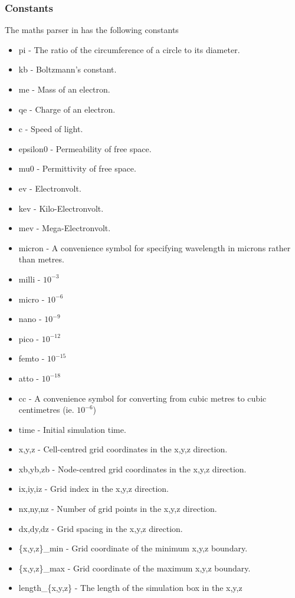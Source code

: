 \subsubsection{Constants}
\label{sec:constants}
The maths parser in {\EPOCH}  has the following constants
\begin{itemize}
\item pi - The ratio of the circumference of a circle to its diameter.
\item kb - Boltzmann's constant.
\item me - Mass of an electron.
\item qe - Charge of an electron.
\item c - Speed of light.
\item epsilon0 - Permeability of free space.
\item mu0 - Permittivity of free space.
\item ev - Electronvolt.
\item kev - Kilo-Electronvolt.
\item mev - Mega-Electronvolt.
\item micron - A convenience symbol for specifying wavelength in microns
  rather than metres.
\item milli - $10^{-3}$
\item micro - $10^{-6}$
\item nano - $10^{-9}$
\item pico - $10^{-12}$
\item femto - $10^{-15}$
\item atto - $10^{-18}$
\item cc - A convenience symbol for converting from cubic metres to cubic
  centimetres (ie. $10^{-6}$)
\item time - Initial simulation time.
\item x,y,z - Cell-centred grid coordinates in the x,y,z direction.
\item xb,yb,zb - Node-centred grid coordinates in the x,y,z direction.
\item ix,iy,iz - Grid index in the x,y,z direction.
\item nx,ny,nz - Number of grid points in the x,y,z direction.
\item dx,dy,dz - Grid spacing in the x,y,z direction.
\item \{x,y,z\}\_min - Grid coordinate of the minimum x,y,z boundary.
\item \{x,y,z\}\_max - Grid coordinate of the maximum x,y,z boundary.
\item length\_\{x,y,z\} - The length of the simulation box in the x,y,z

\end{itemize}
